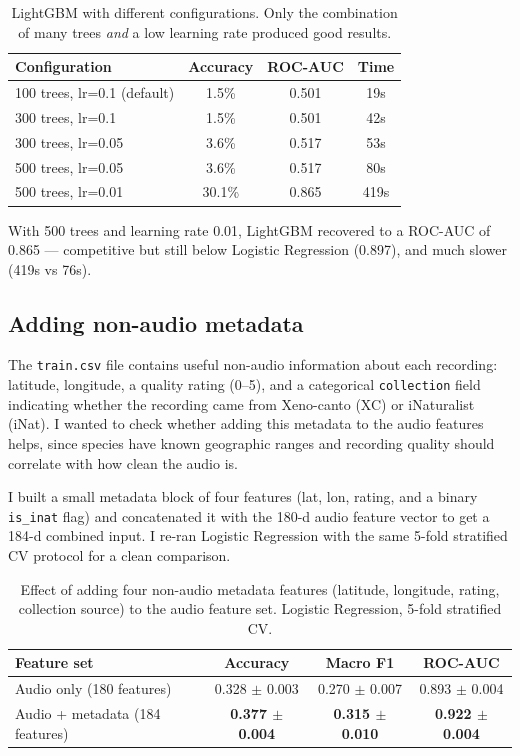 \documentclass[11pt,a4paper]{article}
\begin{document}
\begin{table}[H]
\centering
\begin{tabular}{lccc}
\toprule
Configuration & Accuracy & ROC-AUC & Time \\
\midrule
100 trees, lr=0.1 (default) & 1.5\% & 0.501 & 19s \\
300 trees, lr=0.1 & 1.5\% & 0.501 & 42s \\
300 trees, lr=0.05 & 3.6\% & 0.517 & 53s \\
500 trees, lr=0.05 & 3.6\% & 0.517 & 80s \\
500 trees, lr=0.01 & 30.1\% & 0.865 & 419s \\
\bottomrule
\end{tabular}
\caption{LightGBM with different configurations. Only the combination of many trees \textit{and} a low learning rate produced good results.}
\label{tab:lgbm}
\end{table}

With 500 trees and learning rate 0.01, LightGBM recovered to a ROC-AUC of 0.865 — competitive but still below Logistic Regression (0.897), and much slower (419s vs 76s).

\subsection{Adding non-audio metadata}

The \texttt{train.csv} file contains useful non-audio information about each recording: latitude, longitude, a quality rating (0--5), and a categorical \texttt{collection} field indicating whether the recording came from Xeno-canto (XC) or iNaturalist (iNat). I wanted to check whether adding this metadata to the audio features helps, since species have known geographic ranges and recording quality should correlate with how clean the audio is.

I built a small metadata block of four features (lat, lon, rating, and a binary \texttt{is\_inat} flag) and concatenated it with the 180-d audio feature vector to get a 184-d combined input. I re-ran Logistic Regression with the same 5-fold stratified CV protocol for a clean comparison.

\begin{table}[H]
\centering
\begin{tabular}{lccc}
\toprule
Feature set & Accuracy & Macro F1 & ROC-AUC \\
\midrule
Audio only (180 features) & 0.328 $\pm$ 0.003 & 0.270 $\pm$ 0.007 & 0.893 $\pm$ 0.004 \\
Audio + metadata (184 features) & \textbf{0.377 $\pm$ 0.004} & \textbf{0.315 $\pm$ 0.010} & \textbf{0.922 $\pm$ 0.004} \\
\bottomrule
\end{tabular}
\caption{Effect of adding four non-audio metadata features (latitude, longitude, rating, collection source) to the audio feature set. Logistic Regression, 5-fold stratified CV.}
\label{tab:metadata}
\end{table}
\end{document}
